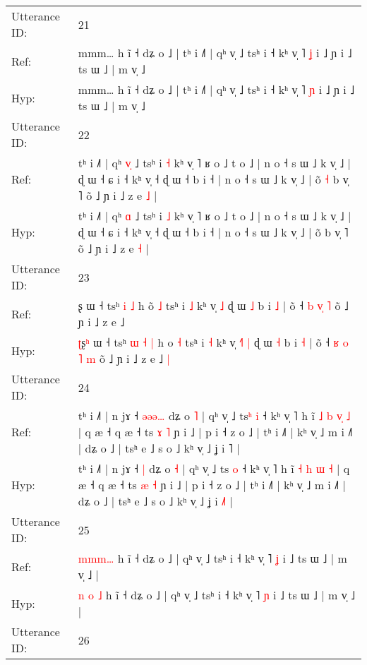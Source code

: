 \documentclass[10pt]{article}
\DeclareRobustCommand{\hl}[1]{{\textcolor{red}{#1}}}
\begin{document}
\begin{longtable}{ll}
 \\
\midrule
Utterance ID: & 21 \\
Ref: & mmm… h ĩ ˧ dʑ o ˩ | tʰ i ˩˥ | qʰ v̩ ˩ tsʰ i ˧ kʰ v̩ ˥ \hl{ʝ} i ˩ ɲ i ˩ ts ɯ ˩ | m v̩ ˩
 \\
Hyp: & mmm… h ĩ ˧ dʑ o ˩ | tʰ i ˩˥ | qʰ v̩ ˩ tsʰ i ˧ kʰ v̩ ˥ \hl{ɲ} i ˩ ɲ i ˩ ts ɯ ˩ | m v̩ ˩
 \\
\midrule
Utterance ID: & 22 \\
Ref: & tʰ i ˩˥ | qʰ \hl{v}\hl{̩} ˩ tsʰ i \hl{˧} kʰ v̩ ˥ ʁ o ˩ t o ˩ | n o ˧ s ɯ ˩ k v̩ ˩ | ɖ ɯ ˧ ɕ i ˧ kʰ v̩ ˧ ɖ ɯ ˧ b i ˧ | n o ˧ s ɯ ˩ k v̩ ˩ | õ\hl{ }\hl{˧} b v̩ ˥ õ ˩ ɲ i ˩ z e \hl{˩} |
 \\
Hyp: & tʰ i ˩˥ | qʰ \hl{}\hl{ɑ} ˩ tsʰ i \hl{˩} kʰ v̩ ˥ ʁ o ˩ t o ˩ | n o ˧ s ɯ ˩ k v̩ ˩ | ɖ ɯ ˧ ɕ i ˧ kʰ v̩ ˧ ɖ ɯ ˧ b i ˧ | n o ˧ s ɯ ˩ k v̩ ˩ | õ\hl{}\hl{} b v̩ ˥ õ ˩ ɲ i ˩ z e \hl{˧} |
 \\
\midrule
Utterance ID: & 23 \\
Ref: & \hl{}ʂ\hl{} ɯ ˧ tsʰ\hl{}\hl{} \hl{i} \hl{˩} h o\hl{̃} \hl{˩} tsʰ i \hl{˩} kʰ v̩\hl{}\hl{}\hl{} \hl{˩} ɖ ɯ \hl{˩} b i \hl{˩} | õ ˧ \hl{b} \hl{}\hl{v}\hl{̩} \hl{˥} õ ˩ ɲ i ˩ z e ˩\hl{}\hl{}
 \\
Hyp: & \hl{ʈ}ʂ\hl{ʰ} ɯ ˧ tsʰ\hl{ }\hl{ɯ} \hl{˧} \hl{|} h o\hl{} \hl{˧} tsʰ i \hl{˧} kʰ v̩\hl{ }\hl{˧}\hl{˥} \hl{|} ɖ ɯ \hl{˧} b i \hl{˧} | õ ˧ \hl{ʁ} \hl{o}\hl{ }\hl{˥} \hl{m} õ ˩ ɲ i ˩ z e ˩\hl{ }\hl{|}
 \\
\midrule
Utterance ID: & 24 \\
Ref: & tʰ i ˩˥ | n jɤ ˧ \hl{ə}\hl{ə}\hl{ə}\hl{…} dʑ o \hl{˥} | qʰ v̩ ˩ ts\hl{ʰ} \hl{i} ˧ kʰ v̩ ˥ h ĩ \hl{˩} \hl{b} \hl{v}\hl{̩} \hl{˩} | q æ ˧ q æ ˧ ts \hl{ɤ} \hl{˥} ɲ i ˩ | p i ˧ z o ˩ | tʰ i ˩˥ | kʰ v̩ ˩ m i ˩˥ | dʑ o ˩ | tsʰ e ˩ s o ˩ kʰ v̩ ˩ ʝ i \hl{}˥ |
 \\
Hyp: & tʰ i ˩˥ | n jɤ ˧ \hl{}\hl{}\hl{}\hl{|} dʑ o \hl{˧} | qʰ v̩ ˩ ts\hl{} \hl{o} ˧ kʰ v̩ ˥ h ĩ \hl{˧} \hl{h} \hl{}\hl{ɯ} \hl{˧} | q æ ˧ q æ ˧ ts \hl{æ} \hl{˧} ɲ i ˩ | p i ˧ z o ˩ | tʰ i ˩˥ | kʰ v̩ ˩ m i ˩˥ | dʑ o ˩ | tsʰ e ˩ s o ˩ kʰ v̩ ˩ ʝ i \hl{˩}˥ |
 \\
\midrule
Utterance ID: & 25 \\
Ref: & \hl{}\hl{m}\hl{m}\hl{m}\hl{…} h ĩ ˧ dʑ o ˩ | qʰ v̩ ˩ tsʰ i ˧ kʰ v̩ ˥ \hl{ʝ} i ˩ ts ɯ ˩ | m v̩ ˩ |
 \\
Hyp: & \hl{n}\hl{ }\hl{o}\hl{ }\hl{˩} h ĩ ˧ dʑ o ˩ | qʰ v̩ ˩ tsʰ i ˧ kʰ v̩ ˥ \hl{ɲ} i ˩ ts ɯ ˩ | m v̩ ˩ |
 \\
\midrule
Utterance ID: & 26 \\

\end{longtable}
\end{document}
